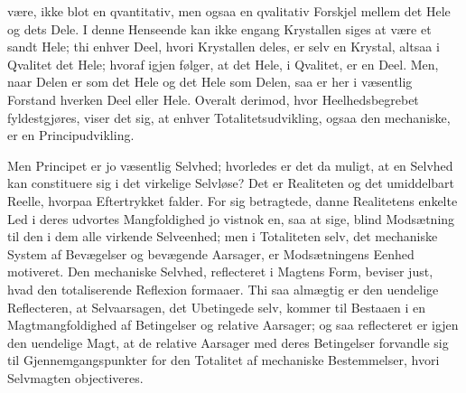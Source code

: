 \documentclass[11pt]{book}
\newcommand{\opage}[1]{\marginnote{\footnotesize\textit{[#1]}}}
\begin{document}
\opage{129} \setcounter{footnote}{0}%
være, ikke blot en qvantitativ, men ogsaa en qvalitativ Forskjel mellem det
Hele og dets Dele. I denne Henseende kan ikke engang Krystallen siges at være
et sandt Hele; thi enhver Deel, hvori Krystallen deles, er selv en Krystal,
altsaa i Qvalitet det Hele; hvoraf igjen følger, at det Hele, i Qvalitet, er
en Deel. Men, naar Delen er som det Hele og det Hele som Delen, saa er her i
væsentlig Forstand hverken Deel eller Hele. Overalt derimod, hvor
Heelhedsbegrebet fyldestgjøres, viser det sig, at enhver Totalitetsudvikling,
ogsaa den mechaniske, er en Principudvikling.

Men Principet er jo væsentlig Selvhed; hvorledes er det da muligt, at en
Selvhed kan constituere sig i det virkelige Selvløse? Det er Realiteten og det
umiddelbart Reelle,
\opage{130} \setcounter{footnote}{0}%
hvorpaa Eftertrykket falder. For sig betragtede, danne Realitetens enkelte Led
i deres udvortes Mangfoldighed jo vistnok en, saa at sige, blind Modsætning
til den i dem alle virkende Selveenhed; men i Totaliteten selv, det mechaniske
System af Bevægelser og bevægende Aarsager, er Modsætningens Eenhed motiveret.
Den mechaniske Selvhed, reflecteret i Magtens Form, beviser just, hvad den
totaliserende Reflexion formaaer. Thi saa almægtig er den uendelige
Reflecteren, at Selvaarsagen, det Ubetingede selv, kommer til Bestaaen i en
Magtmangfoldighed af Betingelser og relative Aarsager; og saa reflecteret er
igjen den uendelige Magt, at de relative Aarsager med deres Betingelser
forvandle sig til Gjennemgangspunkter for den Totalitet af mechaniske
Bestemmelser, hvori Selvmagten objectiveres.
\end{document}
